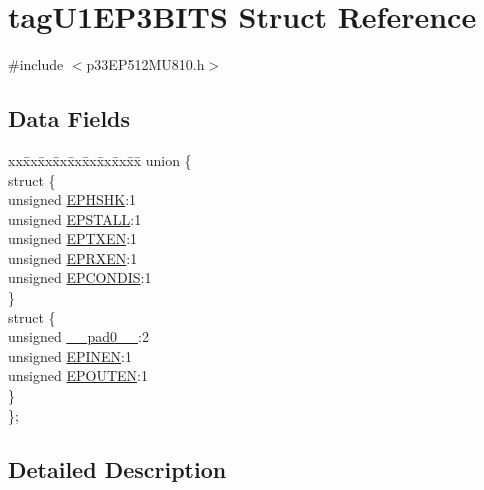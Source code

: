 \hypertarget{structtag_u1_e_p3_b_i_t_s}{}\section{tag\+U1\+E\+P3\+B\+I\+TS Struct Reference}
\label{structtag_u1_e_p3_b_i_t_s}


{\ttfamily \#include $<$p33\+E\+P512\+M\+U810.\+h$>$}

\subsection*{Data Fields}
\begin{DoxyCompactItemize}
\item 
\begin{tabbing}
xx\=xx\=xx\=xx\=xx\=xx\=xx\=xx\=xx\=\kill
union \{\\
\>struct \{\\
\>\>unsigned \hyperlink{structtag_u1_e_p3_b_i_t_s_a0d06430217cb4b189fbe9d0c4b460482}{EPHSHK}:1\\
\>\>unsigned \hyperlink{structtag_u1_e_p3_b_i_t_s_a47042104f04ebe06a23f9789bd400d7e}{EPSTALL}:1\\
\>\>unsigned \hyperlink{structtag_u1_e_p3_b_i_t_s_aa2d88c1be513e759c136823c86a355b4}{EPTXEN}:1\\
\>\>unsigned \hyperlink{structtag_u1_e_p3_b_i_t_s_a8a388d32ceffb87230e660b6793f2857}{EPRXEN}:1\\
\>\>unsigned \hyperlink{structtag_u1_e_p3_b_i_t_s_a1bd26df05d2b5a11b20ee548fce90c3e}{EPCONDIS}:1\\
\>\} \\
\>struct \{\\
\>\>unsigned \hyperlink{structtag_u1_e_p3_b_i_t_s_adf71f3d8410c1f1dbbc96680a92c49af}{\_\_pad0\_\_}:2\\
\>\>unsigned \hyperlink{structtag_u1_e_p3_b_i_t_s_a8b6d98cdf233ac90ff19d16d9a89215e}{EPINEN}:1\\
\>\>unsigned \hyperlink{structtag_u1_e_p3_b_i_t_s_adf87e8acfbb27a5626e21b3e3bd106fd}{EPOUTEN}:1\\
\>\} \\
\}; \\

\end{tabbing}\end{DoxyCompactItemize}


\subsection{Detailed Description}


